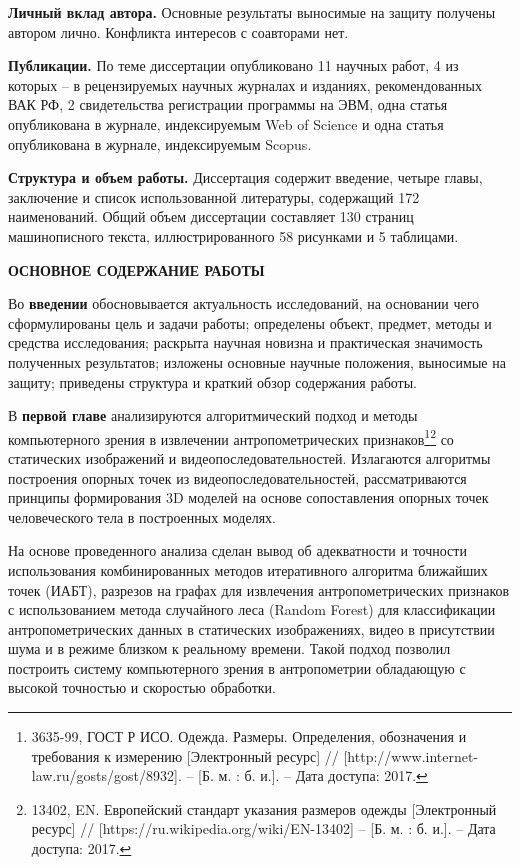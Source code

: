 \textbf{Личный вклад автора.} Основные результаты выносимые на защиту получены автором лично. Конфликта интересов с соавторами нет.

\textbf{Публикации.} По теме диссертации опубликовано 11 научных работ, 4 из которых – в рецензируемых научных журналах и изданиях, рекомендованных ВАК РФ, 2 свидетельства регистрации программы на ЭВМ, одна статья опубликована в журнале, индексируемым Web of Science и одна статья опубликована в журнале, индексируемым Scopus.

\textbf{Структура и объем работы.} Диссертация содержит введение, четыре главы, заключение и список использованной литературы, содержащий 172 наименований. Общий объем диссертации составляет 130 страниц машинописного текста, иллюстрированного 58 рисунками и 5 таблицами.
\begin{center}
\textbf{ОСНОВНОЕ СОДЕРЖАНИЕ РАБОТЫ}
\end{center}

Во {\textbf{введении}} обосновывается актуальность исследований, на основании чего сформулированы цель и задачи работы; определены объект, предмет, методы и средства исследования; раскрыта научная новизна и практическая значимость полученных результатов; изложены основные научные положения, выносимые на защиту; приведены структура и краткий обзор содержания работы.

В \textbf {первой главе} анализируются алгоритмический подход и методы компьютерного зрения в извлечении антропометрических признаков\footnote{3635-99, ГОСТ Р ИСО. Одежда. Размеры. Определения, обозначения и требования к измерению [Электронный ресурс] // [http://www.internet-law.ru/gosts/gost/8932]. -- [Б. м. : б. и.]. -- Дата доступа: 2017.}\footnote{13402, EN. Европейский стандарт указания размеров одежды [Электронный ресурс] // [https://ru.wikipedia.org/wiki/EN-13402] -- [Б. м. : б. и.]. -- Дата доступа: 2017.} со статических изображений и видеопоследовательностей. Излагаются алгоритмы построения опорных точек из видеопоследовательностей, рассматриваются принципы формирования 3D моделей на основе сопоставления опорных точек человеческого тела в построенных моделях.

На основе проведенного анализа сделан вывод об адекватности и точности использования комбинированных методов итеративного алгоритма ближайших точек (ИАБТ), разрезов на графах для извлечения антропометрических признаков с использованием метода случайного леса (Random Forest) для классификации антропометрических данных в статических изображениях, видео в присутствии шума и в режиме близком к реальному времени. Такой подход позволил построить систему компьютерного зрения в антропометрии обладающую с высокой точностью и скоростью обработки.

